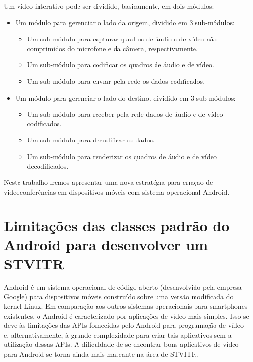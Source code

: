 \documentclass{acm_proc_article-sp}
\begin{document}
Um vídeo interativo pode ser dividido, basicamente, em dois módulos:
\begin{itemize}
 \item Um módulo para gerenciar o lado da origem, dividido em 3 sub-módulos:
 \begin{itemize}
  \item Um sub-módulo para capturar quadros de áudio e de vídeo não comprimidos do microfone e da câmera, respectivamente.
  \item Um sub-módulo para codificar os quadros de áudio e de vídeo.
  \item Um sub-módulo para enviar pela rede os dados codificados.
 \end{itemize}
 \item Um módulo para gerenciar o lado do destino, dividido em 3 sub-módulos:
 \begin{itemize}
  \item Um sub-módulo para receber pela rede dados de áudio e de vídeo codificados.
  \item Um sub-módulo para decodificar os dados.
  \item Um sub-módulo para renderizar os quadros de áudio e de vídeo decodificados.
 \end{itemize}
\end{itemize}

Neste trabalho iremos apresentar uma nova estratégia para criação de videoconferências em dispositivos móveis com sistema operacional Android.

\section{Limitações das classes padrão do Android para desenvolver um STVITR}

Android é um sistema operacional de código aberto (desenvolvido pela empresa Google) para dispositivos móveis construído sobre uma versão modificada do kernel Linux. Em comparação aos outros sistemas operacionais para smartphones existentes, o Android é caracterizado por aplicações de vídeo mais simples. Isso se deve às limitações das APIs fornecidas pelo Android para programação de vídeo e, alternativamente, à grande complexidade para criar tais aplicativos sem a utilização dessas APIs. A dificuldade de se encontrar bons aplicativos de vídeo para Android se torna ainda mais marcante na área de STVITR.
\end{document}

